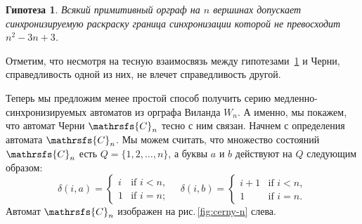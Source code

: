 \documentclass[11pt]{article}
\newcommand{\sa}{synchronizing automata}
\newcommand{\sws}{reset words}
\newtheorem{conjecture}{Гипотеза}
\begin{document}


\begin{conjecture}
\label{hybrid}
Всякий примитивный орграф на $n$ вершинах допускает синхронизируемую раскраску
граница синхронизации которой не превосходит $n^2-3n+3$.

\end{conjecture}


Отметим, что несмотря на тесную взаимосвязь между гипотезами~\ref{hybrid} и Черни,
справедливость одной из них, не влечет справедливость другой.



Теперь мы предложим менее простой способ получить серию медленно-синхронизируемых
автоматов из орграфа Виланда $W_n$. А именно, мы покажем, что автомат 
Черни $\mathrsfs{C}_n$ тесно с ним связан. Начнем с определения автомата $\mathrsfs{C}_n$. 
Мы можем считать, что множество состояний $\mathrsfs{C}_n$ есть $Q=\{1,2,\dots,n\}$,
а буквы $a$ и $b$ действуют на $Q$ следующим образом:
$$\delta(i,a)=\begin{cases}
i &\text{if } i<n,\\
1 &\text{if } i=n;
\end{cases}\quad
\delta(i,b)=\begin{cases}
i+1 &\text{if } i<n,\\
1 &\text{if } i=n.
\end{cases}$$
Автомат $\mathrsfs{C}_n$ изображен на рис.\,\ref{fig:cerny-n} слева.
\end{document}
